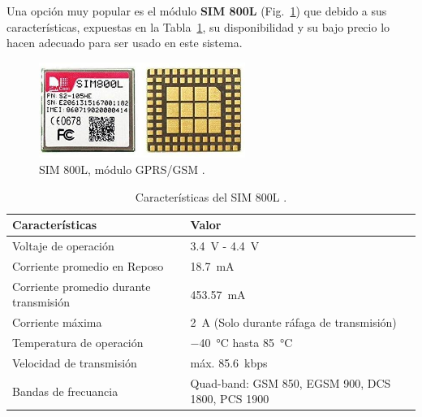 Una opción muy popular es el módulo \textbf{SIM 800L} (Fig.~\ref{fig:SIM}) que debido a sus características, expuestas en la Tabla~\ref{diag:SIM}, su disponibilidad y su bajo precio lo hacen adecuado para ser usado en este sistema.

\begin{figure}[hbtp!]
\centering
\includegraphics[width=0.6\textwidth]{SIM800L.jpg}
\caption[SIM 800L, módulo GPRS/GSM]{SIM 800L, módulo GPRS/GSM \cite{SIM800L}.}
\label{fig:SIM}
\end{figure}

\bgroup
\def\arraystretch{1.5}%
\begin{table}[htbp!]
\centering
\caption[Características del SIM 800L]{Características del SIM 800L \cite{SIM800L}.}
\begin{tabular}{@{}p{5.4cm}p{8cm}@{}}
\toprule
Características & Valor \\ \midrule
Voltaje de operación & \SI{3.4}{V} -  \SI{4.4}{V} \\
Corriente promedio en Reposo & \SI{18.7}{mA} \\
Corriente promedio durante \mbox{transmisión} & \SI{453.57}{mA} \\
Corriente máxima & \SI{2}{A} (Solo durante ráfaga de transmisión) \\
Temperatura de operación & \SI{-40}{\celsius} hasta \SI{85}{\celsius} \\
Velocidad de transmisión & máx. \SI{85.6}{kbps} \\
Bandas de frecuancia & Quad-band: GSM 850, EGSM 900, DCS 1800, PCS 1900 \\ \bottomrule
\end{tabular}
\label{diag:SIM}
\end{table}
\egroup

